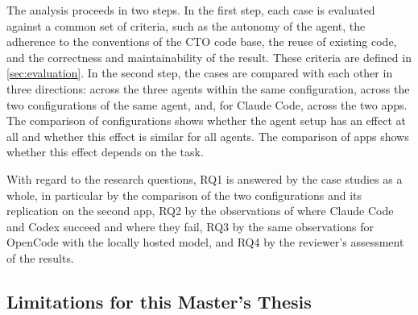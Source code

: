 The analysis proceeds in two steps. In the first step, each case is evaluated against a common set of criteria, such as the autonomy of the agent, the adherence to the conventions of the \ac{CTO} code base, the reuse of existing code, and the correctness and maintainability of the result. These criteria are defined in \cref{sec:evaluation}. In the second step, the cases are compared with each other in three directions: across the three agents within the same configuration, across the two configurations of the same agent, and, for Claude Code, across the two apps. The comparison of configurations shows whether the agent setup has an effect at all and whether this effect is similar for all agents. The comparison of apps shows whether this effect depends on the task. 

With regard to the research questions, RQ1 is answered by the case studies as a whole, in particular by the comparison of the two configurations and its replication on the second app, RQ2 by the observations of where Claude Code and Codex succeed and where they fail, RQ3 by the same observations for OpenCode with the locally hosted model, and RQ4 by the reviewer's assessment of the results.

\subsection{Limitations for this Master's Thesis}
\label{sec:limitations}

